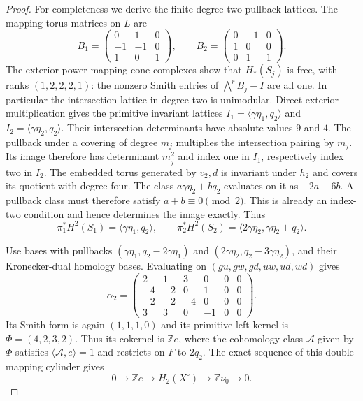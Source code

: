 \begin{proof}
For completeness we derive the finite degree-two
pullback lattices.  The mapping-torus matrices on
$L$ are
\[
 B_1=\begin{pmatrix}0&1&0\\-1&-1&0\\1&0&1\end{pmatrix},
 \qquad
 B_2=\begin{pmatrix}0&-1&0\\1&0&0\\0&1&1\end{pmatrix}.
\]
The exterior-power mapping-cone complexes show that
$H_*(S_j)$ is free, with ranks $(1,2,2,2,1)$:
the nonzero Smith entries of
$\bigwedge^r B_j-I$ are all one.  In particular the
intersection lattice in degree two is unimodular.
Direct exterior multiplication gives the primitive
invariant lattices
$I_1=\langle\gamma\eta_1,q_2\rangle$ and
$I_2=\langle\gamma\eta_2,q_2\rangle$.
Their intersection determinants have absolute values
$9$ and $4$.  The pullback under a covering of degree
$m_j$ multiplies the intersection pairing by $m_j$.
Its image therefore has determinant $m_j^2$ and index
one in $I_1$, respectively index two in $I_2$.
The embedded torus generated by $v_2,d$ is invariant
under $h_2$ and covers its quotient with degree four.
The class $a\gamma\eta_2+bq_2$ evaluates on it as
$-2a-6b$.  A pullback class must therefore satisfy
$a+b\equiv0\pmod2$.  This is already an index-two
condition and hence determines the image exactly.
Thus
\[
 \pi_1^*H^2(S_1)=\langle\gamma\eta_1,q_2\rangle,
 \qquad
 \pi_2^*H^2(S_2)=\langle2\gamma\eta_2,
                                  \gamma\eta_2+q_2\rangle.
 \tag{B.5.13}
\]

Use bases with pullbacks
$(\gamma\eta_1,q_2-2\gamma\eta_1)$ and
$(2\gamma\eta_2,q_2-3\gamma\eta_2)$, and their
Kronecker-dual homology bases.  Evaluating on
$(gu,gw,gd,uw,ud,wd)$ gives
\[
 \alpha_2=
 \begin{pmatrix}
 2&1&3&0&0&0\\-4&-2&0&1&0&0\\
 -2&-2&-4&0&0&0\\3&3&0&-1&0&0
 \end{pmatrix}.
 \tag{B.5.14}
\]
Its Smith form is again $(1,1,1,0)$ and its primitive
left kernel is $\Phi=(4,2,3,2)$.  Thus its cokernel is
$\mathbb Z e$, where the cohomology class $\mathcal A$
given by $\Phi$ satisfies
$\langle\mathcal A,e\rangle=1$ and restricts on $F$
to $2q_2$.  The exact sequence of this double mapping
cylinder gives
\[
 0\longrightarrow\mathbb Z e\longrightarrow
 H_2(X^\circ)\longrightarrow\mathbb Z\nu_0
 \longrightarrow0.
 \tag{B.5.15}
\]


\end{proof}
